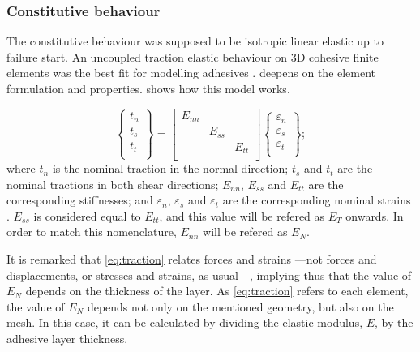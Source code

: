 \documentclass[
documentsize = a4, %
font = cmr, %
typesize = 11, %
printmode = true,
onehalfspacing = true,
language = en, %
titlepage = udciccp, %
degree = pt, %
dedication = true,
acknowledgements = true,
abstract-en = true,
abstract-es = false,
abstract-ga = false,
epigraphs = true,
toc = true,
lof = true,
lot = true,
frontmatterintoc = false,
notation = false,
minimal = false,
]{UDCthesis}
\begin{document}
\subsubsection{Constitutive behaviour}
\label{sec:elastic}

The constitutive behaviour was supposed to be isotropic linear elastic \citep{SernaMoreno2015} up to failure start. An uncoupled traction elastic behaviour \citep{Sadowski2010, Sadowski2011, Scattina2011, Sadowski2014} on 3D cohesive finite elements was the best fit for modelling adhesives \citep{Abaqus613Manual}.  deepens on the element formulation and properties.  shows how this model works.

\begin{equation}
\begin{Bmatrix}
t_n \\
t_s \\
t_t \\
\end{Bmatrix}
=
\begin{bmatrix}
E_{nn} & & \\
& E_{ss} & \\
& & E_{tt} \\
\end{bmatrix}
\begin{Bmatrix}
\varepsilon_n \\
\varepsilon_s \\
\varepsilon_t \\
\end{Bmatrix} ;
\label{eq:traction}
\end{equation}
where $t_n$ is the nominal traction in the normal direction; $t_s$ and $t_t$ are the nominal tractions in both shear directions; $E_{nn}$, $E_{ss}$ and $E_{tt}$ are the corresponding stiffnesses; and $\varepsilon_n$, $\varepsilon_s$ and $\varepsilon_t$ are the corresponding nominal strains \citep{Abaqus613Manual}. $E_{ss}$ is considered equal to $E_{tt}$, and this value will be refered as $E_{T}$ onwards. In order to match this nomenclature, $E_{nn}$ will be refered as $E_{N}$.

It is remarked that \cref{eq:traction} relates forces and strains ---not forces and displacements, or stresses and strains, as usual---, implying thus that the value of $E_{N}$ depends on the thickness of the layer. As \cref{eq:traction} refers to each element, the value of $E_{N}$ depends not only on the mentioned geometry, but also on the mesh. In this case, it can be calculated by dividing the elastic modulus, $E$, by the adhesive layer thickness.
\end{document}
